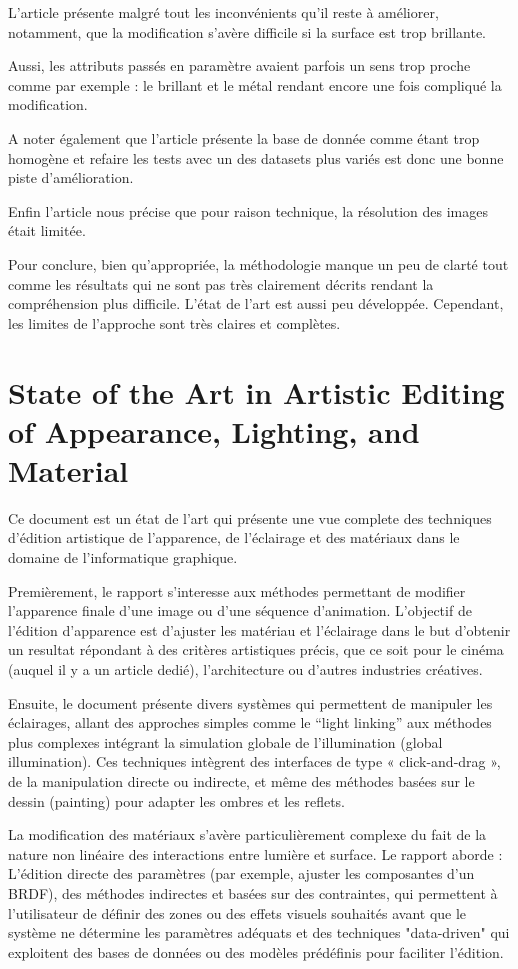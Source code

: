 \documentclass{article}
\begin{document}
L’article présente malgré tout les inconvénients qu’il reste à améliorer, notamment, que la modification s’avère difficile si la surface est trop brillante.

Aussi, les attributs passés en paramètre avaient parfois un sens trop proche comme par exemple : le brillant et le métal rendant encore une fois compliqué la modification.

A noter également que l’article présente la base de donnée comme étant trop homogène et refaire les tests avec un des datasets plus variés est donc une bonne piste d’amélioration.

Enfin l’article nous précise que pour raison technique, la résolution des images était limitée.

Pour conclure, bien qu’appropriée, la méthodologie manque un peu de clarté tout comme les résultats qui ne sont pas très clairement décrits rendant la compréhension plus difficile. L’état de l’art est aussi peu développée. Cependant, les limites de l’approche sont très claires et complètes.

\newpage
\section{State of the Art in Artistic Editing of Appearance, Lighting, and Material}
Ce document est un état de l'art qui présente une vue complete des techniques d'édition artistique de l'apparence, de l'éclairage et des matériaux dans le domaine
de l'informatique graphique.

Premièrement, le rapport s'interesse aux méthodes permettant de modifier l'apparence finale d'une image ou d'une séquence d'animation.
L'objectif de l'édition d'apparence est d'ajuster les matériau et l'éclairage dans le but d'obtenir un resultat répondant à des critères artistiques
précis, que ce soit pour le cinéma (auquel il y a un article dedié), l'architecture ou d'autres industries créatives.

Ensuite, le document présente divers systèmes qui permettent de manipuler les éclairages, allant des approches simples comme le “light linking” aux 
méthodes plus complexes intégrant la simulation globale de l’illumination (global illumination). Ces techniques intègrent des interfaces 
de type « click-and-drag », de la manipulation directe ou indirecte, et même des méthodes basées sur le dessin (painting) pour adapter les ombres 
et les reflets.

La modification des matériaux s’avère particulièrement complexe du fait de la nature non linéaire des interactions entre lumière et surface. 
Le rapport aborde : L’édition directe des paramètres (par exemple, ajuster les composantes d’un BRDF), des méthodes indirectes et basées sur des 
contraintes, qui permettent à l’utilisateur de définir des zones ou des effets visuels souhaités avant que le système ne détermine les paramètres
adéquats et des techniques "data-driven" qui exploitent des bases de données ou des modèles prédéfinis pour faciliter l’édition.
\end{document}
